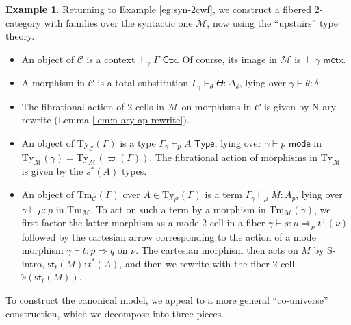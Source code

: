 \documentclass[10pt]{article}
\theoremstyle{definition}
\newtheorem{example}{Example}
\newcommand{\yields}{\vdash}
\newcommand{\tcell}{\Rightarrow}
\newcommand{\CTX}{\,\,\mathsf{Ctx}}
\newcommand{\ctx}{\,\,\mathsf{mctx}}
\newcommand{\TYPE}{\,\,\mathsf{Type}}
\newcommand{\type}{\,\,\mathsf{mode}}
\newcommand{\rewrite}[2]{\overleftarrow{#1}(#2)}
\newcommand\St[2]{\ensuremath{{#1}^*(#2)}}
\newcommand\StI[2]{\ensuremath{\mathsf{st}_{#1}(#2)}}
\newcommand\TypeTwo[4]{\ensuremath{#1 \vdash #2 :  #3 \tcell #4}}
\newcommand\TermTwoT[5]{\ensuremath{#1 \vdash {#2} : #3 \tcell_{#5} #4}}
\newcommand\TrPlus[2]{\ensuremath{{#1}^+(#2)}}
\newcommand\M{\mathcal{M}}
\newcommand\Mty{{\mathrm{Ty}_{\M}}}
\newcommand\Mtm{{\mathrm{Tm}_{\M}}}
\newcommand\C{\mathcal{C}}
\newcommand\Cty{\mathrm{Ty}_{\C}}
\newcommand\Ctm{\mathrm{Tm}_{\C}}
\newcommand\vp{\varpi}
\begin{document}
\begin{example}\label{eg:syn-fib-2cwf}
  Returning to Example \ref{eg:syn-2cwf}, we construct a fibered 2-category with families over the syntactic one $\M$, now using the ``upstairs'' type theory.
  \begin{itemize}
  \item An object of $\C$ is a context $\yields_\gamma \Gamma \CTX$.
    Of course, its image in $\M$ is $\yields \gamma \ctx$.
  \item A morphism in $\C$ is a total substitution $\Gamma_{\gamma} \yields_\theta \Theta : \Delta_\delta$, lying over $\gamma \yields \theta : \delta$.
  \item The fibrational action of 2-cells in $\M$ on morphisms in $\C$ is given by N-ary rewrite (Lemma \ref{lem:n-ary-ap-rewrite}).
  \item An object of $\Cty(\Gamma)$ is a type $\Gamma_\gamma \yields_p A \TYPE$, lying over $\gamma \yields p\type$ in $\Mty(\gamma) = \Mty(\vp(\Gamma))$.
    The fibrational action of morphisms in $\Mty$ is given by the $\St{s}{A}$ types.
  \item An object of $\Ctm(\Gamma)$ over $A\in \Cty(\Gamma)$ is a term $\Gamma_\gamma \yields_\mu M:A_p$, lying over $\gamma \yields \mu:p$ in $\Mtm$.
    To act on such a term by a morphism in $\Mtm(\gamma)$, we first factor the latter morphism as a mode 2-cell in a fiber $\TermTwoT{\gamma}{s}{\mu}{\TrPlus{t}{\nu}}{p}$ followed by the cartesian arrow corresponding to the action of a mode morphism $\TypeTwo{\gamma}{t}{p}{q}$ on $\nu$.
    The cartesian morphism then acts on $M$ by S-intro, $\StI{t}{M} : \St{t}{A}$, and then we rewrite with the fiber 2-cell $\rewrite{s}{\StI{t}{M}}$.
  \end{itemize}
\end{example}

To construct the canonical model, we appeal to a more general ``co-universe'' construction, which we decompose into three pieces.
\end{document}

